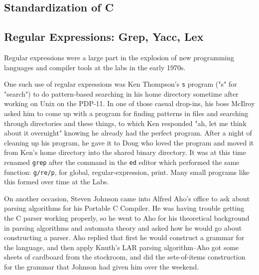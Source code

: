 \subsection{Standardization of C}


\subsection{Regular Expressions: Grep, Yacc, Lex}
\label{sec:software-unix-regex}

Regular expressions were a large part in the explosion of new programming languages
and compiler tools at the labs in the early 1970s.

One such use of regular expressions was Ken Thompson's \texttt{s}
program ("s" for "search") to do pattern-based searching
in his home directory sometime after working on Unix on the PDP-11.
In one of those casual drop-ins, his boss McIlroy asked him to come up with a program for finding
patterns in files and searching through directories and these things, to which Ken responded
"ah, let me think about it overnight" knowing he already had the perfect program.
After a night of cleaning up his program, he gave it to Doug who loved the program
and moved it from Ken's home directory into the shared binary directory.
It was at this time renamed \texttt{grep} after the command in the \texttt{ed} editor
which performed the same function: \texttt{g/re/p}, for global, regular-expression, print.
Many small programs like this formed over time at the Labs.

On another occasion, Steven Johnson came into Alfred Aho's office to ask about
parsing algorithms for his Portable C Compiler. He was having trouble getting the C parser
working properly, so he went to Aho for his theoretical background in parsing algorithms
and automata theory and asked how he would go about constructing a parser.
Aho replied that first he would construct a grammar for the language, and then apply
Knuth's LAR parsing algorithm--Aho got some sheets of cardboard from the stockroom,
and did the sets-of-items construction for the grammar that Johnson had given him
over the weekend.


